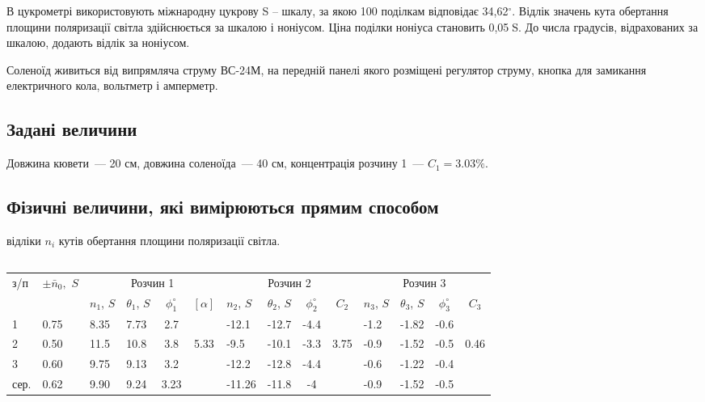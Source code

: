 \documentclass[12pt]{article}
\begin{document}
{В цукрометрі використовують міжнародну цукрову S – шкалу, за якою 100
поділкам відповідає 34,62$^\circ$. Відлік значень кута обертання площини
поляризації світла здійснюється за шкалою і ноніусом. Ціна поділки
ноніуса становить 0,05\textdegree S. До числа градусів, відрахованих за шкалою,
додають відлік за ноніусом.

Соленоїд живиться від випрямляча струму ВС-24М, на передній панелі
якого розміщені регулятор струму, кнопка для замикання електричного
кола, вольтметр і амперметр.

\subsection*{Задані величини}
Довжина кювети~--- 20 см, довжина соленоїда~--- 40 см, концентрація
розчину 1~--- $C_1=3.03\%.$

\subsection*{Фізичні величини, які вимірюються прямим способом}
відліки $n_i$ кутів обертання площини поляризації світла.

\subsection*{}

\renewcommand{\arraystretch}{1.3}
\begin{center}
	\begin{tabular}{|p{20pt}|p{25pt}|p{25pt}|p{25pt}|c|c|p{40pt}|p{30pt}|c|c|p{30pt}|p{30pt}|c|c|}
	\hline
		\No{} з/п & $\pm\bar n_0,$ \textdegree$S$ & \multicolumn{4}{c|}{Розчин 1}
		& \multicolumn{4}{c|}{Розчин 2} & \multicolumn{4}{c|}{Розчин 3} \\
	\cline{3-14}
		& & $n_1$, \textdegree$S$ & $\theta_1$, \textdegree$S$ & $\phi_1^\circ$ & $[\alpha]$ &
		$n_2$, \textdegree$S$ & $\theta_2$, \textdegree$S$ & $\phi_2^\circ$ & $C_2$ &
		$n_3$, \textdegree$S$ & $\theta_3$, \textdegree$S$ & $\phi_3^\circ$ & $C_3$ \\
		\hline
		1 & 0.75 & 8.35 & 7.73 & 2.7 & & -12.1 & -12.7 & -4.4 & & -1.2 & -1.82 & -0.6 & \\
		\cline{1-5} \cline{7-9} \cline{11-13}
		2 & 0.50 & 11.5 & 10.8 & 3.8 & 5.33 & -9.5 & -10.1 & -3.3 & 3.75 & -0.9 & -1.52 & -0.5 & 0.46 \\
		\cline{1-5} \cline{7-9} \cline{11-13}
		3 & 0.60 & 9.75 & 9.13 & 3.2 & & -12.2 & -12.8 & -4.4 & & -0.6 & -1.22 & -0.4 & \\
		\cline{1-5} \cline{7-9} \cline{11-13}
		сер. & 0.62 & 9.90 & 9.24 & 3.23 & & -11.26 & -11.8 & -4 & & -0.9 & -1.52 & -0.5 & \\
		\hline
\end{tabular}

\end{center}
}
\end{document}
